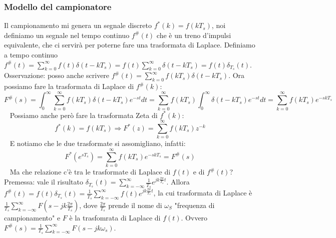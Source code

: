 \begin{landscape}
\begin{multicols*}{2}
    \subsubsection{Modello del campionatore}
    Il campionamento mi genera un segnale discreto $f^*(k) = f(k T_s)$, noi definiamo un segnale nel tempo continuo $f^\# (t)$ che è un treno d'impulsi equivalente, che ci servirà per poterne fare una trasformata di Laplace.\newline
    \newline
    Definiamo a tempo continuo $f^\# (t) = \sum_{k=0}^{\infty} f(t) \delta(t-kT_s) = f(t) \sum_{k=0}^{\infty} \delta(t-kT_s) = f(t) \delta_{T_s} (t)$.\newline
    \newline
    Osservazione: posso anche scrivere $f^\# (t) = \sum_{k=0}^{\infty} f(kT_s) \delta(t-kT_s)$.\newline
    \newline
    Ora possiamo fare la trasformata di Laplace di $f^\#(k)$:
    \[
        F^\# (s) = \int_{0}^{\infty} \sum_{k=0}^{\infty} f(kT_s) \delta(t-kT_s) e^{-st} dt = \sum_{k=0}^{\infty} f(kT_s) \int_{0}^{\infty} \delta(t-kT_s) e^{-st} dt = \sum_{k=0}^{\infty} f(kT_s) e^{-skT_s}
    \]
    \ \newline
    Possiamo anche però fare la trasformata Zeta di $f^*(k)$:
    \[
        f^*(k) = f(kT_s) \Rightarrow  F^*(z) = \sum_{k=0}^{\infty} f(kT_s) z^{-k}
    \]
    \ \newline
    E notiamo che le due trasformate si assomigliano, infatti:
    \[
        F^*(e^{sT_s}) = \sum_{k=0}^{\infty} f(kT_s)e^{-skT_s} = F^\#(s)
    \]
    \ \newline
    Ma che relazione c'è tra le trasformate di Laplace di $f(t)$ e di $f^\#(t)$?\newline
    Premessa: vale il risultato $\delta_{T_s} (t) = \sum_{k=-\infty}^{\infty} \frac{1}{T_s} e^{j k \frac{2\pi}{T_s}t}$.\newline
    Allora $f^\#(t) = f(t) \delta_{T_s}(t) = \frac{1}{T_s} \sum_{k=-\infty}^{\infty} f(t) e^{j k \frac{2\pi}{T_s}t}$, la cui trasformata di Laplace è $\frac{1}{T_s} \sum_{k=-\infty}^{\infty} F (s- j k \frac{2\pi}{T_s})$, dove $\frac{2\pi}{T_s}$ prende il nome di $\omega_S$ "frequenza di campionamento" e $F$ è la trasfomrata di Laplace di $f(t)$.\newline
    Ovvero $F^\#(s) = \frac{1}{T_s} \sum_{k=-\infty}^{\infty} F (s- j k \omega_s)$.\newline
    \newline

\end{multicols*}
\end{landscape}
